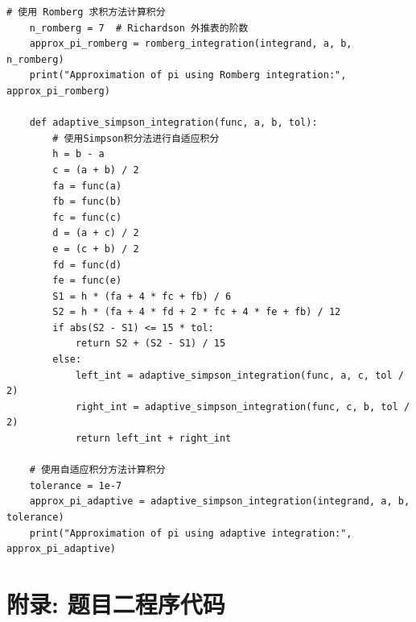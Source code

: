 \documentclass[UTF8,ctexart,a4paper,11pt,openany]{article}
\theoremstyle{definition}
\begin{document}
\begin{lstlisting}[aboveskip=0pt]
    # 使用 Romberg 求积方法计算积分
    n_romberg = 7  # Richardson 外推表的阶数
    approx_pi_romberg = romberg_integration(integrand, a, b, n_romberg)
    print("Approximation of pi using Romberg integration:", approx_pi_romberg)
    
    def adaptive_simpson_integration(func, a, b, tol):
        # 使用Simpson积分法进行自适应积分
        h = b - a
        c = (a + b) / 2
        fa = func(a)
        fb = func(b)
        fc = func(c)
        d = (a + c) / 2
        e = (c + b) / 2
        fd = func(d)
        fe = func(e)
        S1 = h * (fa + 4 * fc + fb) / 6
        S2 = h * (fa + 4 * fd + 2 * fc + 4 * fe + fb) / 12
        if abs(S2 - S1) <= 15 * tol:
            return S2 + (S2 - S1) / 15
        else:
            left_int = adaptive_simpson_integration(func, a, c, tol / 2)
            right_int = adaptive_simpson_integration(func, c, b, tol / 2)
            return left_int + right_int
    
    # 使用自适应积分方法计算积分
    tolerance = 1e-7
    approx_pi_adaptive = adaptive_simpson_integration(integrand, a, b, tolerance)
    print("Approximation of pi using adaptive integration:", approx_pi_adaptive)
\end{lstlisting}

\clearpage



\section{附录: 题目二程序代码}
\end{document}
